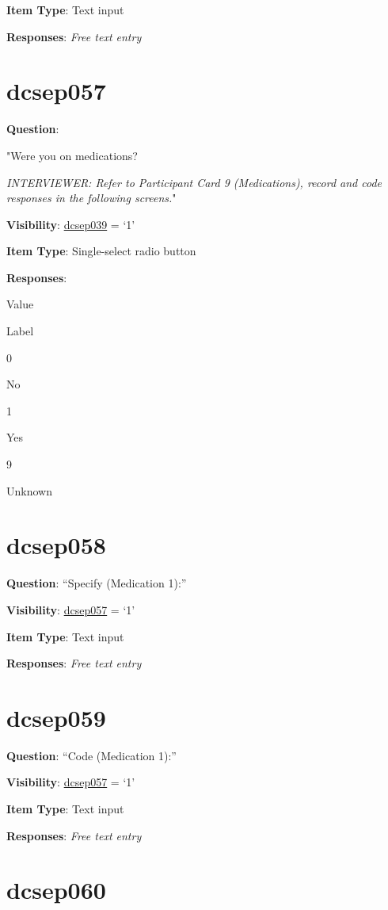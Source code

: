 \documentclass[]{book}
\begin{document}
\textbf{Item Type}: Text input

\textbf{Responses}: \emph{Free text entry}

\hypertarget{dcsep057}{%
\section{dcsep057}\label{dcsep057}}

\textbf{Question}:

"Were you on medications?

\emph{INTERVIEWER: Refer to Participant Card 9 (Medications), record and code responses in the following screens.}"

\textbf{Visibility}: \protect\hyperlink{dcsep039}{dcsep039} = `1'

\textbf{Item Type}: Single-select radio button

\textbf{Responses}:

Value

Label

0

No

1

Yes

9

Unknown

\hypertarget{dcsep058}{%
\section{dcsep058}\label{dcsep058}}

\textbf{Question}: ``Specify (Medication 1):''

\textbf{Visibility}: \protect\hyperlink{dcsep057}{dcsep057} = `1'

\textbf{Item Type}: Text input

\textbf{Responses}: \emph{Free text entry}

\hypertarget{dcsep059}{%
\section{dcsep059}\label{dcsep059}}

\textbf{Question}: ``Code (Medication 1):''

\textbf{Visibility}: \protect\hyperlink{dcsep057}{dcsep057} = `1'

\textbf{Item Type}: Text input

\textbf{Responses}: \emph{Free text entry}

\hypertarget{dcsep060}{%
\section{dcsep060}\label{dcsep060}}
\end{document}
